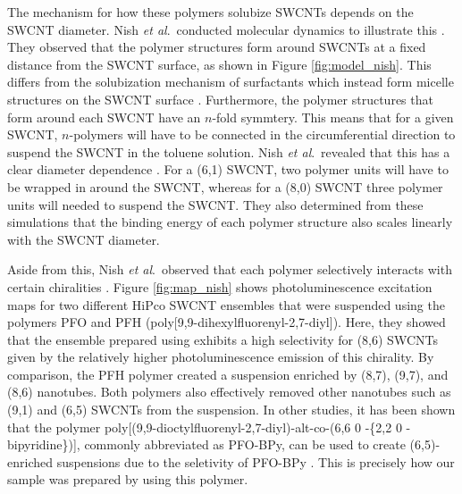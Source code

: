 The mechanism for how these polymers solubize SWCNTs depends on the SWCNT diameter. Nish \textit{et al}.\ conducted molecular dynamics to illustrate this \cite{nish2007highly}. They observed that the polymer structures form around SWCNTs at a fixed distance from the SWCNT surface, as shown in Figure \ref{fig:model_nish}. This differs from the solubization mechanism of surfactants which instead form micelle structures on the SWCNT surface \cite{richard2003supramolecular}. Furthermore, the polymer structures that form around each SWCNT have an $n$-fold symmtery. This means that for a given SWCNT, $n$-polymers will have to be connected in the circumferential direction to suspend the SWCNT in the toluene solution. Nish \textit{et al}.\ revealed that this has a clear diameter dependence \cite{nish2007highly}. For a (6,1) SWCNT, two polymer units will have to be wrapped in around the SWCNT, whereas for a (8,0) SWCNT three polymer units will needed to suspend the SWCNT. They also determined from these simulations that the binding energy of each polymer structure also scales linearly with the SWCNT diameter.

Aside from this, Nish \textit{et al}.\ observed that each polymer selectively interacts with certain chiralities  \cite{nish2007highly}. Figure \ref{fig:map_nish} shows photoluminescence excitation maps for two different HiPco SWCNT ensembles that were suspended using the polymers PFO and PFH (poly[9,9-dihexylfluorenyl-2,7-diyl]). Here, they showed that the ensemble prepared using exhibits a high selectivity for (8,6) SWCNTs given by the relatively higher photoluminescence emission of this chirality. By comparison, the PFH polymer created a suspension enriched by (8,7), (9,7), and (8,6) nanotubes. Both polymers also effectively removed other nanotubes such as (9,1) and (6,5) SWCNTs from the suspension. In other studies, it has been shown that the polymer poly[(9,9-dioctylfluorenyl-2,7-diyl)-alt-co-(6,6 0 -\{2,2 0 -bipyridine\})], commonly abbreviated as PFO-BPy, can be used to create (6,5)-enriched suspensions due to the seletivity of PFO-BPy \cite{hertel2010diffusion, ozawa2011one, gomulya2013conjugated}. This is precisely how our sample was prepared by using this polymer.



